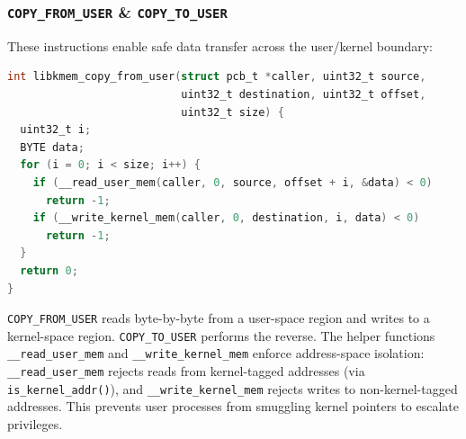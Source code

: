 \subsubsection{\texttt{COPY\_FROM\_USER} \& \texttt{COPY\_TO\_USER}}
These instructions enable safe data transfer across the user/kernel boundary:
\begin{lstlisting}[language=C, caption=Cross-boundary memory copy (\texttt{libmem.c})]
int libkmem_copy_from_user(struct pcb_t *caller, uint32_t source, 
                           uint32_t destination, uint32_t offset, 
                           uint32_t size) {
  uint32_t i;
  BYTE data;
  for (i = 0; i < size; i++) {
    if (__read_user_mem(caller, 0, source, offset + i, &data) < 0)
      return -1;
    if (__write_kernel_mem(caller, 0, destination, i, data) < 0)
      return -1;
  }
  return 0;
}
\end{lstlisting}
\texttt{COPY\_FROM\_USER} reads byte-by-byte from a user-space region and writes to a kernel-space region. \texttt{COPY\_TO\_USER} performs the reverse. The helper functions \texttt{\_\_read\_user\_mem} and \texttt{\_\_write\_kernel\_mem} enforce address-space isolation: \texttt{\_\_read\_user\_mem} rejects reads from kernel-tagged addresses (via \texttt{is\_kernel\_addr()}), and \texttt{\_\_write\_kernel\_mem} rejects writes to non-kernel-tagged addresses. This prevents user processes from smuggling kernel pointers to escalate privileges.